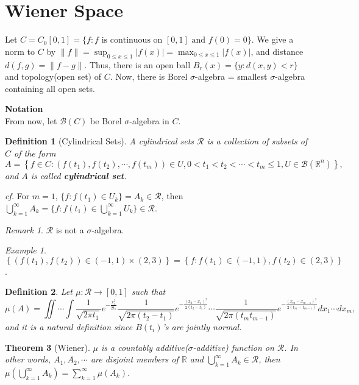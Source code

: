 \documentclass[12pt]{report}
\newcommand{\R}{\mathbb{R}}
\renewcommand{\1}{\mathbb{1}}
\theoremstyle{break}
\newtheorem{thm}{Theorem}[section] %
\theoremstyle{newdef}
\newtheorem{defn}[thm]{Definition} %
\theoremstyle{remark}
\newtheorem*{exmp}{Example} %
\newtheorem*{rem}{Remark} %
\begin{document}
\section{Wiener Space}
Let $C = C_0[0,1] = \{ f : f \text{ is continuous on } [0,1] \text{ and } f(0) = 0\}$.
We give a norm to $C$ by $\|f\| = \sup_{0 \leq x \leq 1} |f(x)| = \max_{0 \leq x \leq 1} |f(x)|$,
and distance $d(f,g) = \|f-g\|$.
Thus, there is an open ball $B_r(x) = \{ y : d(x,y) < r \}$ and topology(open set) of $C$.
Now, there is Borel $\sigma$-algebra = smallest $\sigma$-algebra containing all open sets.

\vspace{5mm}

\textbf{Notation}\\
From now, let $\mathcal{B}(C)$ be Borel $\sigma$-algebra in $C$.

\begin{defn}[Cylindrical Sets]
A cylindrical sets $\mathcal{R}$ is a collection of subsets of $C$ of the form
$$A = \left\{ f \in C : \left(f(t_1), f(t_2), \cdots, f(t_m)\right) \in U,
0 < t_1 < t_2 < \cdots < t_m \leq 1, U \in \mathcal{B}(\R^n)\right\},$$
and $A$ is called \textbf{cylindrical set}.
\end{defn}

\textit{cf.} For $m = 1$, $\{ f : f(t_1) \in U_k \} = A_k \in \mathcal{R}$,
then $\bigcup_{k=1}^\infty A_k = \{ f : f(t_1) \in \bigcup_{k=1}^\infty U_k\} \in \mathcal{R}$.

\begin{rem}
$\mathcal{R}$ is not a $\sigma$-algebra.
\end{rem}

\begin{exmp}
$\left\{ (f(t_1), f(t_2)) \in (-1,1) \times (2,3)\right\}
= \left\{ f : f(t_1) \in (-1,1), f(t_2) \in (2,3) \right\}$.
\end{exmp}



\begin{defn}
Let $\mu : \mathcal{R} \rightarrow [0,1]$ such that
$$
\mu(A) = \iint \cdots \int \frac{1}{\sqrt{2\pi t_1}} e^{-\frac{x_1^2}{2t_1}} \frac{1}{\sqrt{2\pi (t_2-t_1)}} e^{-\frac{(x_2-x_1)^2}{2(t_2-t_1)}} \cdots \frac{1}{\sqrt{2\pi (t_mt_{m-1})}} e^{-\frac{(x_m-x_{m-1})^2}{2(t_m - t_{m-1})}} dx_1 \cdots dx_m,
$$
and it is a natural definition since $B(t_i)$'s are jointly normal.
\end{defn}




\begin{thm}[Wiener]
$\mu$ is a countably additive($\sigma$-additive) function on $\mathcal{R}$.
In other words,
$A_1, A_2, \cdots$ are disjoint members of $\R$ and $\bigcup_{k=1}^\infty A_k \in \mathcal{R}$,
then $\mu(\bigcup_{k=1}^\infty A_k) = \sum_{k=1}^\infty \mu(A_k)$.
\end{thm}
\end{document}
